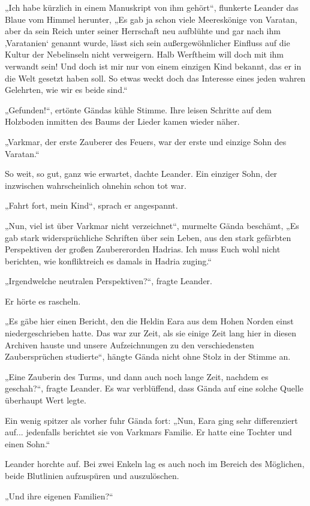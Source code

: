 \documentclass[10pt, a4paper, oneside]{book}
\begin{document}
„Ich habe kürzlich in einem Manuskript von ihm gehört“, flunkerte Leander das Blaue vom Himmel herunter, „Es gab ja schon viele Meereskönige von Varatan, aber da sein Reich unter seiner Herrschaft neu aufblühte und gar nach ihm ‚Varatanien‘ genannt wurde, lässt sich sein außergewöhnlicher Einfluss auf die Kultur der Nebelinseln nicht verweigern. Halb Werftheim will doch mit ihm verwandt sein! Und doch ist mir nur von einem einzigen Kind bekannt, das er in die Welt gesetzt haben soll. So etwas weckt doch das Interesse eines jeden wahren Gelehrten, wie wir es beide sind.“

„Gefunden!“, ertönte Gändas kühle Stimme. Ihre leisen Schritte auf dem Holzboden inmitten des Baums der Lieder kamen wieder näher.

„Varkmar, der erste Zauberer des Feuers, war der erste und einzige Sohn des Varatan.“

So weit, so gut, ganz wie erwartet, dachte Leander. Ein einziger Sohn, der inzwischen wahrscheinlich ohnehin schon tot war.

„Fahrt fort, mein Kind“, sprach er angespannt.

„Nun, viel ist über Varkmar nicht verzeichnet“, murmelte Gända beschämt, „Es gab stark widersprüchliche Schriften über sein Leben, aus den stark gefärbten Perspektiven der großen Zaubererorden Hadrias. Ich muss Euch wohl nicht berichten, wie konfliktreich es damals in Hadria zuging.“

„Irgendwelche neutralen Perspektiven?“, fragte Leander.

Er hörte es rascheln.

„Es gäbe hier einen Bericht, den die Heldin Eara aus dem Hohen Norden einst niedergeschrieben hatte. Das war zur Zeit, als sie einige Zeit lang hier in diesen Archiven hauste und unsere Aufzeichnungen zu den verschiedensten Zaubersprüchen studierte“, hängte Gända nicht ohne Stolz in der Stimme an.

„Eine Zauberin des Turms, und dann auch noch lange Zeit, nachdem es geschah?“, fragte Leander. Es war verblüffend, dass Gända auf eine solche Quelle überhaupt Wert legte.

Ein wenig spitzer als vorher fuhr Gända fort: „Nun, Eara ging sehr differenziert auf... jedenfalls berichtet sie von Varkmars Familie. Er hatte eine Tochter und einen Sohn.“

Leander horchte auf. Bei zwei Enkeln lag es auch noch im Bereich des Möglichen, beide Blutlinien aufzuspüren und auszulöschen.

„Und ihre eigenen Familien?“
\end{document}
